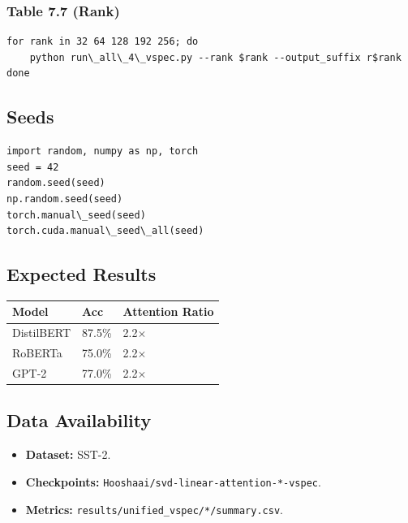 \subsubsection{Table 7.7 (Rank)}
\begin{lstlisting}
for rank in 32 64 128 192 256; do
    python run\_all\_4\_vspec.py --rank $rank --output_suffix r$rank
done
\end{lstlisting}

\subsection{Seeds}

\begin{lstlisting}
import random, numpy as np, torch
seed = 42
random.seed(seed)
np.random.seed(seed)
torch.manual\_seed(seed)
torch.cuda.manual\_seed\_all(seed)
\end{lstlisting}

\subsection{Expected Results}

\begin{table}[H]
\centering
\small
\begin{tabular}{lll}
\toprule
\textbf{Model} & \textbf{Acc} & \textbf{Attention Ratio} \\
\midrule
DistilBERT & 87.5\% & 2.2$\times$ \\
RoBERTa & 75.0\% & 2.2$\times$ \\
GPT-2 & 77.0\% & 2.2$\times$ \\
\bottomrule
\end{tabular}
\end{table}

\subsection{Data Availability}

\begin{itemize}
\item \textbf{Dataset:} SST-2.
\item \textbf{Checkpoints:} \texttt{Hooshaai/svd-linear-attention-*-vspec}.
\item \textbf{Metrics:} \texttt{results/unified\_vspec/*/summary.csv}.

\end{itemize}
